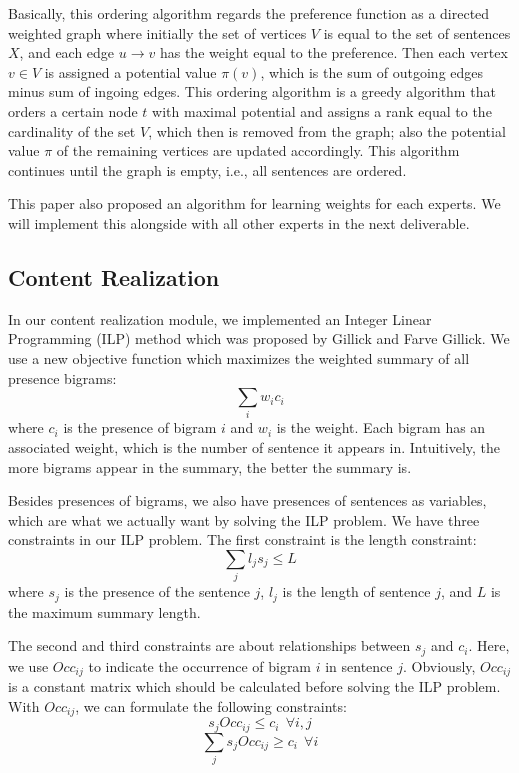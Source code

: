 \documentclass[11pt]{article}
\begin{document}
\indent
Basically, this ordering algorithm regards the preference function as a directed weighted graph where initially the set of vertices $V$ is equal to the set of sentences $X$, and each edge $u\rightarrow v$ has the weight equal to the preference. Then each vertex $v\in V$ is assigned a potential value $\pi(v)$, which is the sum of outgoing edges minus sum of ingoing edges. This ordering algorithm is a greedy algorithm that orders a certain node $t$ with maximal potential and assigns a rank equal to the cardinality of the set $V$, which then is removed from the graph; also the potential value $\pi$ of the remaining vertices are updated accordingly. This algorithm continues until the graph is empty, i.e., all sentences are ordered. 

\indent
This paper also proposed an algorithm for learning weights for each experts. We will implement this alongside with all other experts in the next deliverable.

\subsection{Content Realization}

In our content realization module, we implemented an Integer Linear Programming (ILP) method which was proposed by Gillick and Farve Gillick. We use a new objective function which maximizes the weighted summary of all presence bigrams:  
\begin{equation}
	\sum_i{w_ic_i}
\end{equation} 
where $c_i$ is the presence of bigram $i$ and $w_i$ is the weight. Each bigram has an associated weight, which is the number of sentence it appears in. Intuitively, the more bigrams appear in the summary, the better the summary is. 

Besides presences of bigrams, we also have presences of sentences as variables, which are what we actually want by solving the ILP problem. We have three constraints in our ILP problem. The first constraint is the length constraint:
\begin{equation}
	\sum_j{l_js_j} \leq L 
\end{equation} 
where $s_j$ is the presence of the sentence $j$, $l_j$ is the length of sentence $j$, and $L$ is the maximum summary length. 

The second and third constraints are about relationships between $s_j$ and $c_i$. Here, we use $Occ_{ij}$ to indicate the occurrence of bigram $i$ in sentence $j$. Obviously, $Occ_{ij}$ is a constant matrix which should be calculated before solving the ILP problem. With $Occ_{ij}$, we can formulate the following constraints:
\begin{equation}
	s_jOcc_{ij} \leq c_i\ \  \forall i,j
\end{equation}
\begin{equation}
	\sum_j s_jOcc_{ij} \geq c_i\ \  \forall i
\end{equation}
\end{document}
